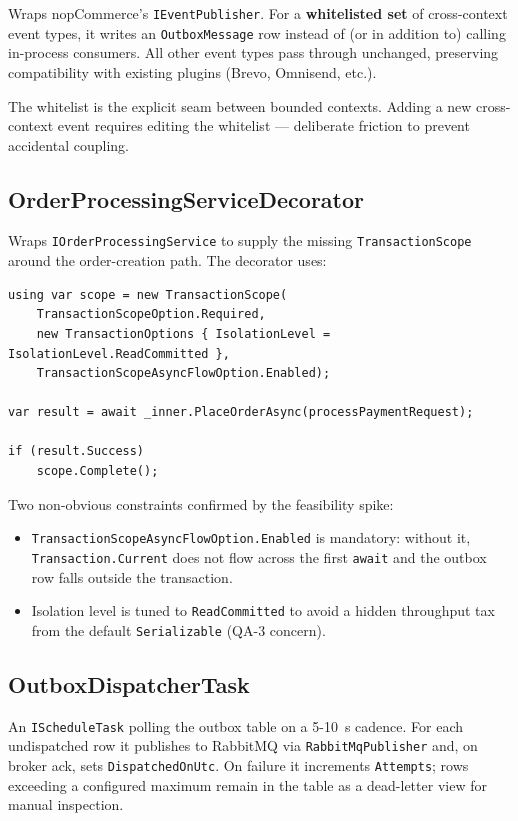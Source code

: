 Wraps nopCommerce's \texttt{IEventPublisher}. For a \textbf{whitelisted set} of cross-context event types, it writes an \texttt{OutboxMessage} row instead of (or in addition to) calling in-process consumers. All other event types pass through unchanged, preserving compatibility with existing plugins (Brevo, Omnisend, etc.).

The whitelist is the explicit seam between bounded contexts. Adding a new cross-context event requires editing the whitelist — deliberate friction to prevent accidental coupling.

\subsection{OrderProcessingServiceDecorator}

Wraps \texttt{IOrderProcessingService} to supply the missing \texttt{TransactionScope} around the order-creation path. The decorator uses:

\begin{lstlisting}[language={[Sharp]C}, caption={TransactionScope pattern used in the decorator}]
using var scope = new TransactionScope(
    TransactionScopeOption.Required,
    new TransactionOptions { IsolationLevel = IsolationLevel.ReadCommitted },
    TransactionScopeAsyncFlowOption.Enabled);

var result = await _inner.PlaceOrderAsync(processPaymentRequest);

if (result.Success)
    scope.Complete();
\end{lstlisting}

Two non-obvious constraints confirmed by the feasibility spike:
\begin{itemize}
    \item \texttt{Transaction\-Scope\-Async\-Flow\-Option.\-Enabled} is mandatory: without it, \texttt{Transaction.\-Current} does not flow across the first \texttt{await} and the outbox row falls outside the transaction.
    \item Isolation level is tuned to \texttt{ReadCommitted} to avoid a hidden throughput tax from the default \texttt{Serializable} (QA-3 concern).
\end{itemize}

\subsection{OutboxDispatcherTask}

An \texttt{IScheduleTask} polling the outbox table on a 5-10~s cadence. For each undispatched row it publishes to RabbitMQ via \texttt{RabbitMqPublisher} and, on broker ack, sets \texttt{DispatchedOnUtc}. On failure it increments \texttt{Attempts}; rows exceeding a configured maximum remain in the table as a dead-letter view for manual inspection.

